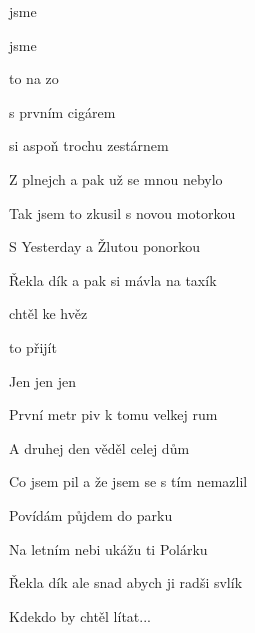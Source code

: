 

\zr
{} jsme 

 jsme 

 to  na zo
\kr

\zs
{} s prvním cigárem

 si aspoň trochu zestárnem

Z plnejch  a pak už se mnou nebylo 
\ks

\zs
Tak jsem to zkusil s novou motorkou

S Yesterday a Žlutou ponorkou

Řekla dík a pak si mávla na taxík
\ks

\zs
{} chtěl  ke hvěz

 to  přijít 

Jen  jen  jen 
\ks

\zr
\kr

\zs
První metr piv k tomu velkej rum

A druhej den věděl celej dům

Co jsem pil a že jsem se s tím nemazlil
\ks

\zs
Povídám půjdem do parku

Na letním nebi ukážu ti Polárku

Řekla dík ale snad abych ji radši svlík
\ks

\zs
Kdekdo by chtěl lítat...
\ks

\zr
\kr

\zr
\kr

\kp



















